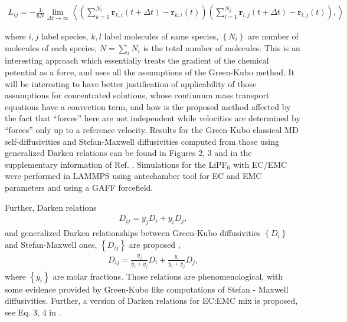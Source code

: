 \documentclass[../main.tex]{subfiles}
\begin{document}
\begin{equation} \begin{array}{l}
    \displaystyle L_{ij} = - \frac{1}{6 N} \lim_{\Delta t \rightarrow \infty}
    \left\langle
   \left( \sum_{k=1}^{N_i} \mathbf{r}_{k,i} (t + \Delta t) - \mathbf{r}_{k,i} (t ) \right)
   \left( \sum_{l=1}^{N_j}  \mathbf{r}_{l,j} (t + \Delta t) - \mathbf{r}_{l,j} (t ) \right),
    \right\rangle
    \label{StMGKMD}
\end{array} \end{equation}

\noindent where $i,j$ label species, $k,l$ label molecules of same species,  $\left\{ N_i \right\}$ are number of molecules of each species, $N= \sum_i N_i$ is the total number of molecules. This is an interesting approach which essentially treats the gradient of the chemical potential as a force, and uses all the assumptions of the Green-Kubo method. It will be interesting to have better justification of applicability of those assumptions for concentrated solutions, whose continuum mass transport equations have a convection term, and how is the proposed method affected by the fact that ``forces'' here are not independent while velocities are determined by ``forces'' only up to a reference velocity. Results for the Green-Kubo classical MD self-diffusivities and Stefan-Maxwell diffusivities computed from those using generalized Darken relations can be found in Figures 2, 3 and in the supplementary information of Ref. . Simulations for the  LiPF$_6$ with EC/EMC were performed in LAMMPS using antechamber tool for EC and EMC parameters and using a GAFF \cite{Wang2004GAAF} forcefield.

Further, Darken \cite{Darken} relations 
\begin{equation} \begin{array}{l}
    \displaystyle  D_{ij} = y_j D_i + y_i D_j ,
    \label{Darken}
\end{array} \end{equation}
and generalized Darken relationships between Green-Kubo diffusivities $\left\{ D_i \right\}$ and Stefan-Maxwell ones, $\left\{ D_{ij}\right\}$ are proposed \cite{rosstaylor1993,Krishna2005,Mallarapu2021},
\begin{equation} \begin{array}{l}
    \displaystyle  D_{ij} = \frac{y_j}{y_i+y_j} D_i + \frac{y_i}{y_i+y_j} D_j ,
    \label{DarkenGen}
\end{array} \end{equation}
where $\left\{ y_i \right\}$ are molar fractions. Those relations are phenomenological, with some evidence provided by Green-Kubo like computations of Stefan - Maxwell diffusivities\cite{Krishna2005}. Further, a version of Darken relations for EC:EMC mix is proposed, see Eq. 3, 4 in \cite{Mallarapu2021}.
\end{document}
